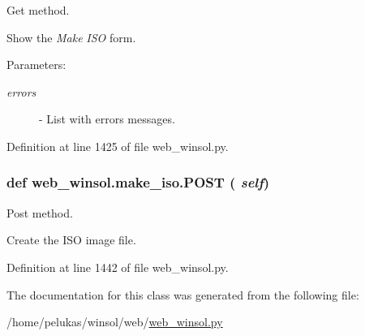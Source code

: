 Get method. 

Show the {\em Make\/} {\em ISO\/} form.

\begin{Desc}
\item[Parameters:]
\begin{description}
\item[{\em errors}]- List with errors messages. \end{description}
\end{Desc}


Definition at line 1425 of file web\_\-winsol.py.\hypertarget{classweb__winsol_1_1make__iso_107bb45348816c5fca668a244f05a0e8}{
\subsubsection[POST]{\setlength{\rightskip}{0pt plus 5cm}def web\_\-winsol.make\_\-iso.POST ( {\em self})}}
\label{classweb__winsol_1_1make__iso_107bb45348816c5fca668a244f05a0e8}


Post method. 

Create the ISO image file. 

Definition at line 1442 of file web\_\-winsol.py.

The documentation for this class was generated from the following file:\begin{CompactItemize}
\item 
/home/pelukas/winsol/web/\hyperlink{web__winsol_8py}{web\_\-winsol.py}\end{CompactItemize}

